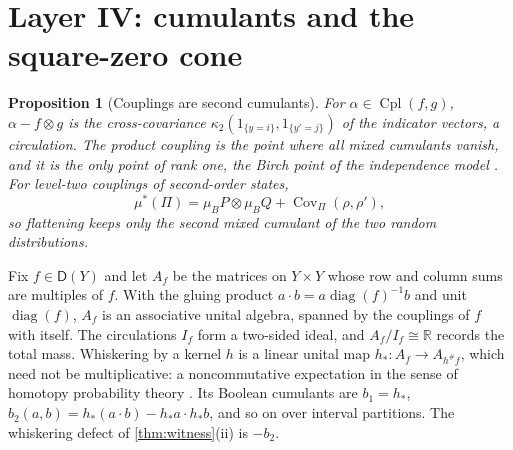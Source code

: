 \documentclass[11pt]{article}
\newtheorem{proposition}[theorem]{Proposition}
\theoremstyle{definition}
\theoremstyle{remark}
\newcommand{\D}{\mathsf{D}}
\newcommand{\Cpl}{\operatorname{Cpl}}
\begin{document}
\section{Layer IV: cumulants and the square-zero cone}\label{sec:linear}

\begin{proposition}[Couplings are second cumulants]\label{prop:kappa2}
For $\alpha\in\Cpl(f,g)$, $\alpha-f\otimes g$ is the cross-covariance $\kappa_2(1_{\{y=i\}},1_{\{y'=j\}})$ of the indicator vectors, a
circulation. The product coupling is the point where all mixed cumulants vanish, and it is the only point of
rank one, the Birch point of the independence model \cite{PachterSturmfels2005}. For level-two couplings of
second-order states,
\[
\mu^*(\Pi)=\mu_BP\otimes\mu_BQ+\operatorname{Cov}_\Pi(\rho,\rho'),
\]
so flattening keeps only the second mixed cumulant of the two random distributions.
\end{proposition}

Fix $f\in\D(Y)$ and let $A_f$ be the matrices on $Y\times Y$ whose row and column sums are multiples of $f$. With the
gluing product $a\cdot b=a\operatorname{diag}(f)^{-1}b$ and unit $\operatorname{diag}(f)$, $A_f$ is an associative unital algebra, spanned by
the couplings of $f$ with itself. The circulations $I_f$ form a two-sided ideal, and $A_f/I_f\cong\mathbb R$ records the total
mass. Whiskering by a kernel $h$ is a linear unital map $h_*\colon A_f\to A_{h^\#f}$, which need not be multiplicative: a
noncommutative expectation in the sense of homotopy probability theory \cite{HPT1,HPT2}. Its Boolean cumulants
\cite{SpeicherWoroudi1997} are $b_1=h_*$, $b_2(a,b)=h_*(a\cdot b)-h_*a\cdot h_*b$, and so on over interval partitions. The
whiskering defect of \cref{thm:witness}(ii) is $-b_2$.
\end{document}
